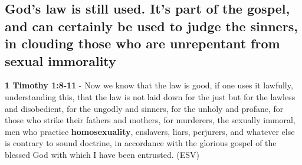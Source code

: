 \documentclass[11pt]{article}
\begin{document}
\subsection{God's law is still used. It's part of the gospel, and can certainly be used to judge the sinners, in clouding those who are unrepentant from sexual immorality}
\label{sec:orgd139e53}
\textbf{1 Timothy 1:8-11} - Now we know that the law is good, if one uses it lawfully, understanding this, that the law is not laid down for the just but for the lawless and disobedient, for the ungodly and sinners, for the unholy and profane, for those who strike their fathers and mothers, for murderers, the sexually immoral, men who practice \textbf{homosexuality}, enslavers, liars, perjurers, and whatever else is contrary to sound doctrine, in accordance with the glorious gospel of the blessed God with which I have been entrusted. (ESV)
\end{document}
